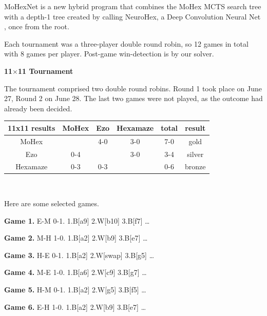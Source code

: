 \documentclass{icga}
\newif\iflong\longfalse  %
\def\Eo{\mbox{\sc Ezo}}
\def\Hz{\mbox{\sc Hexamaze}}
\def\Mx{\mbox{\sc MoHex}}
\def\Mt{\mbox{\sc MoHexNet}}
\def\Nx{\mbox{\sc NeuroHex}}
\begin{document}
\Mt{} is a new hybrid program that combines
the \Mx{} MCTS search tree with a 
depth-1 tree created by calling \Nx{}, 
a Deep Convolution Neural Net , once from the root.

Each tournament was a three-player double round robin, so 12 games
in total with 8 games per player.
Post-game win-detection is by our solver.

{\large\bf 11$\times$11 Tournament}

The tournament comprised two double round robins.
Round 1 took place on June 27, Round 2 on June 28.
The last two games were not played,
as the outcome had already been decided.

\hfill\begin{tabular}{|c|c|c|c|c|c|}
\hline 11x11 results &\Mx{} &\Eo{}  & \Hz{}  & total & result \\ 
\hline \Mx{}         &      &  4-0  &  3-0   & 7-0  &  gold \\
\hline \Eo{}         &  0-4 &       &  3-0   & 3-4  &  silver \\
\hline \Hz{}         &  0-3 &  0-3  &        & 0-6  &  bronze \\
\hline
\end{tabular}\hfill~

Here are some selected games.
\iflong
This is the longer version, so we include all games.
\fi

{\bf Game 1.}
{\sc E-M 0-1.}
1.B[a9] 2.W[b10] 3.B[f7] \ldots ~ ~ 

{\bf Game 2.}
{\sc M-H 1-0.}
1.B[a2] 2.W[b9] 3.B[e7] \ldots ~ ~ 

{\bf Game 3.}
{\sc H-E 0-1.}
1.B[a2] 2.W[swap] 3.B[g5] \ldots ~ ~ 

{\bf Game 4.}
{\sc M-E 1-0.}
1.B[a6] 2.W[c9] 3.B[g7] \ldots ~ ~ 

{\bf Game 5.}
{\sc H-M 0-1.}
1.B[a2] 2.W[g5] 3.B[f5] \ldots ~ ~ 

{\bf Game 6.}
{\sc E-H 1-0.}
1.B[a2] 2.W[b9] 3.B[e7] \ldots ~ ~ 
\end{document}
